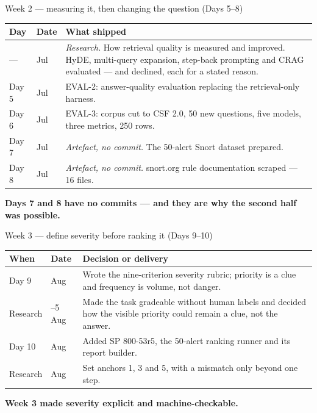 \documentclass[aspectratio=169,11pt]{beamer}
\newcommand{\keytake}[1]{%
  \vfill
  \noindent\colorbox{accenttint}{%
    \begin{minipage}{\dimexpr\textwidth-2\fboxsep-2\fboxrule\relax}
      \vspace{2pt}
      \small\color{accent}\textbf{#1}
      \vspace{2pt}
    \end{minipage}}\par}
\begin{document}
\begin{frame}{Week 2 --- measuring it, then changing the question (Days 5--8)}
  \leavevmode
  {\footnotesize
  \begin{tabular}{@{}>{\raggedright\arraybackslash}p{}
                    >{\raggedright\arraybackslash}p{}
                    >{\raggedright\arraybackslash}p{}@{}}
    \toprule
    \textbf{Day} & \textbf{Date} & \textbf{What shipped} \\
    \midrule
    --- & 27 Jul & \emph{Research.} How retrieval quality is measured and improved. HyDE, multi-query expansion, step-back prompting and CRAG evaluated --- and declined, each for a stated reason. \\
    Day 5 & 28 Jul & EVAL-2: answer-quality evaluation replacing the retrieval-only harness. \\
    Day 6 & 29 Jul & EVAL-3: corpus cut to CSF 2.0, 50 new questions, five models, three metrics, 250 rows. \\
    Day 7 & 30 Jul & \emph{Artefact, no commit.} The 50-alert Snort dataset prepared. \\
    Day 8 & 31 Jul & \emph{Artefact, no commit.} snort.org rule documentation scraped --- 16 files. \\
    \bottomrule
  \end{tabular}}
  \keytake{Days 7 and 8 have no commits --- and they are why the second half was possible.}
\end{frame}

\begin{frame}{Week 3 --- define severity before ranking it (Days 9--10)}
  \leavevmode
  {\footnotesize
  \begin{tabular}{@{}>{\raggedright\arraybackslash}p{}
                    >{\raggedright\arraybackslash}p{}
                    >{\raggedright\arraybackslash}p{}@{}}
    \toprule
    \textbf{When} & \textbf{Date} & \textbf{Decision or delivery} \\
    \midrule
    Day 9 & 3 Aug & Wrote the nine-criterion severity rubric; priority is a clue and frequency is volume, not danger. \\
    Research & 4--5 Aug & Made the task gradeable without human labels and decided how the visible priority could remain a clue, not the answer. \\
    Day 10 & 6 Aug & Added SP 800-53r5, the 50-alert ranking runner and its report builder. \\
    Research & 7 Aug & Set anchors 1, 3 and 5, with a mismatch only beyond one step. \\
    \bottomrule
  \end{tabular}}
  \keytake{Week 3 made severity explicit and machine-checkable.}
\end{frame}
\end{document}
